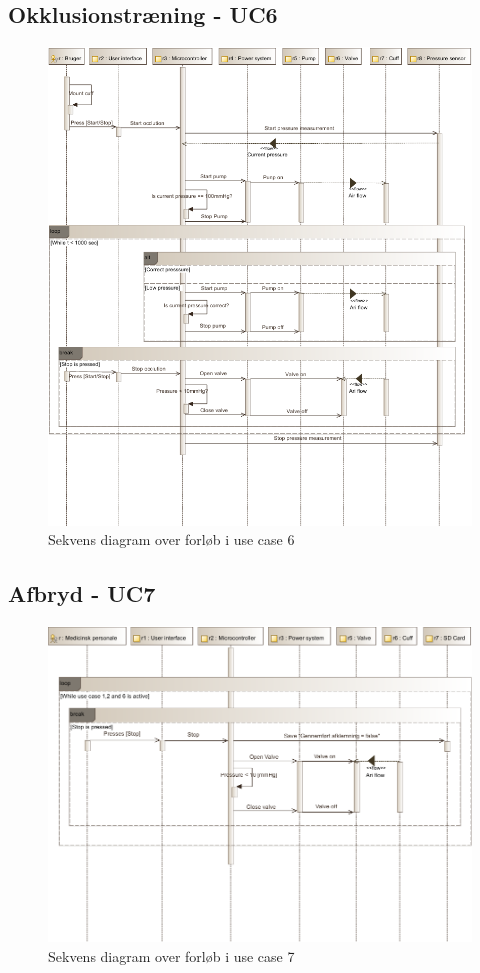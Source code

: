 \subsection{Okklusionstræning - UC6}
\begin{figure}[H]
	\includegraphics[width=\textwidth]{pdfs/SD_UC6-crop.pdf}
\caption{Sekvens diagram over forløb i use case 6}
\end{figure}
\newpage

\subsection{Afbryd - UC7}
\begin{figure}[H]
	\includegraphics[width=\textwidth]{pdfs/SD_UC7-crop.pdf}
\caption{Sekvens diagram over forløb i use case 7}
\end{figure}
\newpage


